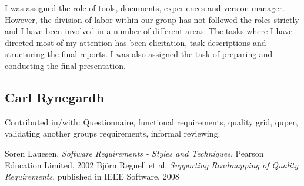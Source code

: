 \documentclass[10pt,a4paper]{article}
\begin{document}
I was assigned the role of tools, documents, experiences and version manager. However, the division of labor within our group has not followed the roles strictly and I have been involved in a number of different areas. The tasks where I have directed most of my attention has been elicitation, task descriptions and structuring the final reports. I was also assigned the task of preparing and conducting the final presentation. 


\subsection{Carl Rynegardh}
Contributed in/with: Questionnaire, functional requirements, quality grid, quper, validating another groups requirements, informal reviewing.

\begin{thebibliography}{99}
	Soren Lauesen,
  	\emph{Software Requirements - Styles and Techniques},
  	Pearson Education Limited, 2002
	Björn Regnell et al,
	\emph{Supporting Roadmapping of Quality Requirements},
	published in IEEE Software, 2008

\end{thebibliography}
\end{document}
